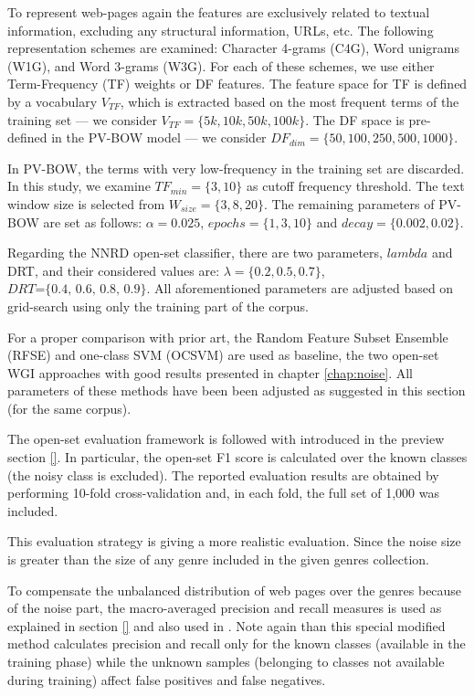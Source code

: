 To represent web-pages again the features are exclusively related to textual information, excluding any structural information, URLs, etc. The following representation schemes are examined: Character 4-grams (C4G), Word unigrams (W1G), and Word 3-grams (W3G). For each of these schemes, we use either Term-Frequency (TF) weights or DF features. The feature space for TF is defined by a vocabulary $V_{TF}$, which is extracted based on the most frequent terms of the training set --- we consider $V_{TF}=\{5k,10k,50k,100k\}$. The DF space is pre-defined in the PV-BOW model --- we consider $DF_{dim}=\{50,100,250,500,1000\}$.

In PV-BOW, the terms with very low-frequency in the training set are discarded. In this study, we examine $TF_{min}=\{3,10\}$ as cutoff frequency threshold. The text window size is selected from $W_{size}=\{3,8,20\}$. The remaining parameters of PV-BOW are set as follows: $\alpha=0.025$, $epochs=\{1, 3, 10\}$ and $decay=\{0.002, 0.02\}$.

Regarding the NNRD open-set classifier, there are two parameters, $lambda$ and DRT, and their considered values are: $\lambda =\{0.2, 0.5, 0.7\}$, $DRT\textit{=\{0.4, 0.6, 0.8, 0.9\}}$. All aforementioned parameters are adjusted based on grid-search using only the training part of the corpus.

For a proper comparison with prior art, the Random Feature Subset Ensemble (RFSE) and one-class SVM (OCSVM) \parencite{pritsos2013open,pritsos2018open} are used as baseline, the two open-set WGI approaches with good results presented in chapter \ref{chap:noise}. All parameters of these methods have been been adjusted as suggested in this section (for the same corpus).

The open-set evaluation framework is followed with  introduced in the preview section \ref{}. In particular, the open-set F1 score \parencite{mendesjunior2016} is calculated over the known classes (the noisy class is excluded). The reported evaluation results are obtained by performing 10-fold cross-validation and, in each fold, the full set of 1,000  was included. 

This evaluation strategy is giving a more realistic evaluation. Since the noise size is greater than the size of any genre included in the given genres collection.

To compensate the unbalanced distribution of web pages over the genres because of the noise part, the macro-averaged precision and recall measures is used as explained in section \ref{} and also used in \parencite{mendesjunior2016}. Note again than this special modified method calculates precision and recall only for the known classes (available in the training phase) while the unknown samples (belonging to classes not available during training) affect false positives and false negatives. 

